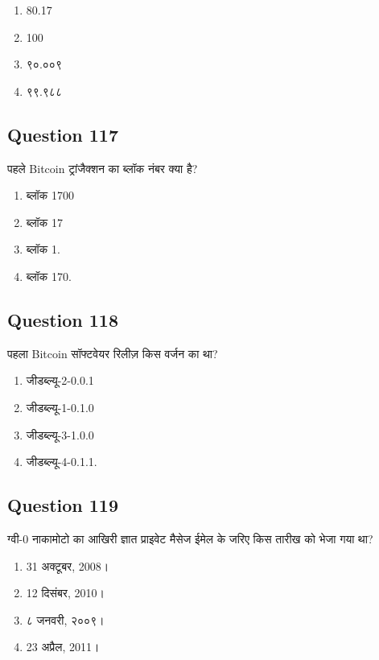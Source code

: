 \documentclass[12pt,a4paper]{article}
\begin{document}
\begin{enumerate}[label=\Alph*., leftmargin=*]
\item 80.17%
\item 100%
\item ९०.००९%
\item ९९.९८८%
\end{enumerate}

\bigskip


\subsection*{Question 117}
पहले Bitcoin ट्रांजैक्शन का ब्लॉक नंबर क्या है?

\begin{enumerate}[label=\Alph*., leftmargin=*]
\item ब्लॉक 1700
\item ब्लॉक 17
\item ब्लॉक 1.
\item ब्लॉक 170.
\end{enumerate}

\bigskip


\subsection*{Question 118}
पहला Bitcoin सॉफ्टवेयर रिलीज़ किस वर्जन का था?

\begin{enumerate}[label=\Alph*., leftmargin=*]
\item जीडब्ल्यू-2-0.0.1
\item जीडब्ल्यू-1-0.1.0
\item जीडब्ल्यू-3-1.0.0
\item जीडब्ल्यू-4-0.1.1.
\end{enumerate}

\bigskip


\subsection*{Question 119}
ग्वी-0 नाकामोटो का आखिरी ज्ञात प्राइवेट मैसेज ईमेल के जरिए किस तारीख को भेजा गया था?

\begin{enumerate}[label=\Alph*., leftmargin=*]
\item 31 अक्टूबर, 2008।
\item 12 दिसंबर, 2010।
\item ८ जनवरी, २००९।
\item 23 अप्रैल, 2011।
\end{enumerate}
\end{document}
